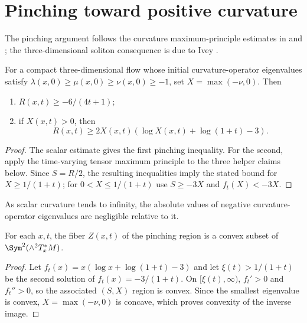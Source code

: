 \section{Pinching toward positive curvature}
The pinching argument follows the curvature maximum-principle estimates in
\cite{HamiltonNSRF3M} and \cite{HamiltonNSRF3M}; the three-dimensional soliton consequence is due to
Ivey \cite{Ivey}.
\begin{theorem}
\label{thm:pinching-toward-positive-curvature}
\label{pinch}
For a compact three-dimensional flow whose initial curvature-operator
eigenvalues satisfy $\lambda(x,0)\ge\mu(x,0)\ge\nu(x,0)\ge-1$, set
$X=\max(-\nu,0)$. Then
\begin{enumerate}
\item $R(x,t)\ge-6/(4t+1)$;
\item if $X(x,t)>0$, then
\[
R(x,t)\ge2X(x,t)(\log X(x,t)+\log(1+t)-3).
\]
\end{enumerate}
\end{theorem}
\begin{proof}
\sketch The scalar estimate gives the first pinching inequality. For the
second, apply the time-varying tensor maximum principle to the three helper
claims below. Since $S=R/2$, the resulting inequalities imply the stated bound
for $X\ge1/(1+t)$; for $0<X\le1/(1+t)$ use $S\ge-3X$ and
$f_t(X)<-3X$.
\end{proof}
\begin{remark}
\label{rem:pinching-negative-eigenvalues-small}

As scalar curvature tends to infinity, the absolute values of negative
curvature-operator eigenvalues are negligible relative to it.
\end{remark}

\begin{claim}
\label{claim:pinching-region-convex}
For each $x,t$, the fiber $Z(x,t)$ of the pinching region is a convex subset
of $\Sym^2(\wedge^2T_x^*M)$.
\end{claim}
\begin{proof}
\sketch Let $f_t(x)=x(\log x+\log(1+t)-3)$ and let $\xi(t)>1/(1+t)$ be the
second solution of $f_t(x)=-3/(1+t)$. On $[\xi(t),\infty)$, $f_t'>0$
and $f_t''>0$, so the associated $(S,X)$ region is convex. Since the
smallest eigenvalue is convex, $X=\max(-\nu,0)$ is concave, which proves
convexity of the inverse image.
\end{proof}

